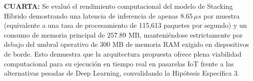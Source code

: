 \vspace{0.8em}
\noindent \textbf{CUARTA:} Se evaluó el rendimiento computacional del modelo de Stacking Híbrido demostrando una latencia de inferencia de apenas $8.65\,\mu s$ por muestra (equivalente a una tasa de procesamiento de 115,613 paquetes por segundo) y un consumo de memoria principal de $257.89\text{ MB}$, manteniéndose estrictamente por debajo del umbral operativo de $300\text{ MB}$ de memoria RAM exigido en dispositivos de borde. Esto demuestra que la arquitectura propuesta ofrece plena viabilidad computacional para su ejecución en tiempo real en pasarelas IoT frente a las alternativas pesadas de Deep Learning, convalidando la Hipótesis Específica 3.